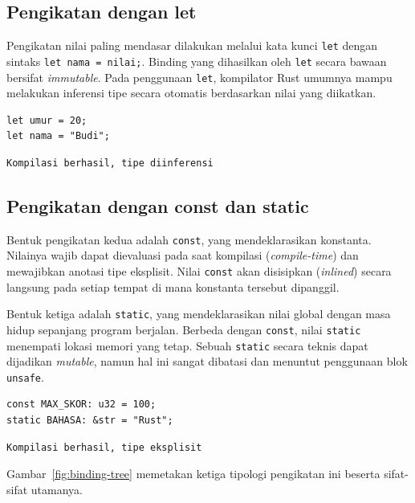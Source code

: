 \documentclass[11pt,a4paper]{article}
\begin{document}
\subsection{Pengikatan dengan let}

Pengikatan nilai paling mendasar dilakukan melalui kata kunci \texttt{let} dengan sintaks \texttt{let nama = nilai;}. Binding yang dihasilkan oleh \texttt{let} secara bawaan bersifat \textit{immutable}. Pada penggunaan \texttt{let}, kompilator Rust umumnya mampu melakukan inferensi tipe secara otomatis berdasarkan nilai yang diikatkan.

\begin{lstlisting}[style=code]
let umur = 20;
let nama = "Budi";
\end{lstlisting}

\begin{lstlisting}[style=out]
Kompilasi berhasil, tipe diinferensi
\end{lstlisting}

\subsection{Pengikatan dengan const dan static}

Bentuk pengikatan kedua adalah \texttt{const}, yang mendeklarasikan konstanta. Nilainya wajib dapat dievaluasi pada saat kompilasi (\textit{compile-time}) dan mewajibkan anotasi tipe eksplisit. Nilai \texttt{const} akan disisipkan (\textit{inlined}) secara langsung pada setiap tempat di mana konstanta tersebut dipanggil.

Bentuk ketiga adalah \texttt{static}, yang mendeklarasikan nilai global dengan masa hidup sepanjang program berjalan. Berbeda dengan \texttt{const}, nilai \texttt{static} menempati lokasi memori yang tetap. Sebuah \texttt{static} secara teknis dapat dijadikan \textit{mutable}, namun hal ini sangat dibatasi dan menuntut penggunaan blok \texttt{unsafe}.

\begin{lstlisting}[style=code]
const MAX_SKOR: u32 = 100;
static BAHASA: &str = "Rust";
\end{lstlisting}

\begin{lstlisting}[style=out]
Kompilasi berhasil, tipe eksplisit
\end{lstlisting}

Gambar~\ref{fig:binding-tree} memetakan ketiga tipologi pengikatan ini beserta sifat-sifat utamanya.
\end{document}
